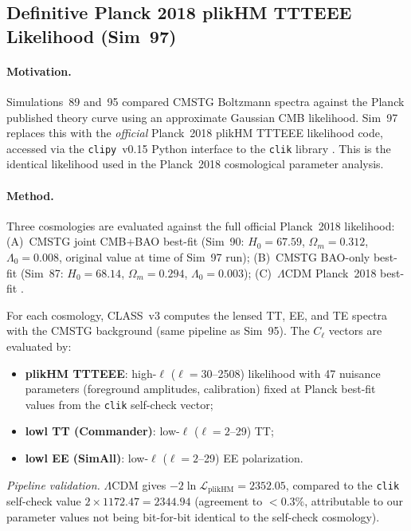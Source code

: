 \documentclass[12pt,a4paper]{article}
\begin{document}
\subsection{Definitive Planck 2018 plikHM TTTEEE Likelihood (Sim~97)}
\label{sec:obs_plikHM}

\paragraph{Motivation.} Simulations~89 and~95 compared CMSTG Boltzmann spectra
against the Planck published theory curve using an approximate Gaussian CMB
likelihood.  Sim~97 replaces this with the \emph{official} Planck~2018 plikHM
TTTEEE likelihood code, accessed via the \texttt{clipy}~v0.15 Python interface
to the \texttt{clik} library \citep{Planck2020}.  This is the identical likelihood
used in the Planck~2018 cosmological parameter analysis.

\paragraph{Method.}  Three cosmologies are evaluated against the full official
Planck~2018 likelihood:
(A)~CMSTG joint CMB+BAO best-fit (Sim~90: $H_0=67.59$, $\Omega_m=0.312$, $\Lambda_0=0.008$, original value at time of Sim~97 run);
(B)~CMSTG BAO-only best-fit (Sim~87: $H_0=68.14$, $\Omega_m=0.294$, $\Lambda_0=0.003$);
(C)~$\Lambda$CDM Planck~2018 best-fit \citep{Planck2020}.

For each cosmology, CLASS~v3 computes the lensed TT, EE, and TE spectra with the
CMSTG background (same pipeline as Sim~95).  The $C_\ell$ vectors are evaluated by:
\begin{itemize}
  \item \textbf{plikHM TTTEEE}: high-$\ell$ ($\ell=30$--2508) likelihood with 47
        nuisance parameters (foreground amplitudes, calibration) fixed at Planck best-fit
        values from the \texttt{clik} self-check vector;
  \item \textbf{lowl TT (Commander)}: low-$\ell$ ($\ell=2$--29) TT;
  \item \textbf{lowl EE (SimAll)}: low-$\ell$ ($\ell=2$--29) EE polarization.
\end{itemize}

\emph{Pipeline validation.}
$\Lambda$CDM gives $-2\ln\mathcal{L}_\mathrm{plikHM}=2352.05$, compared to the
\texttt{clik} self-check value $2\times 1172.47 = 2344.94$ (agreement to $<0.3\%$,
attributable to our parameter values not being bit-for-bit identical to the
self-check cosmology).
\end{document}
